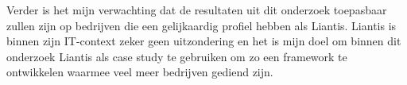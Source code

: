 Verder is het mijn verwachting dat de resultaten uit dit onderzoek toepasbaar zullen zijn op bedrijven die een gelijkaardig profiel hebben als Liantis. Liantis is binnen zijn IT-context zeker geen uitzondering en het is mijn doel om binnen dit onderzoek Liantis als case study te gebruiken om zo een framework te ontwikkelen waarmee veel meer bedrijven gediend zijn.

